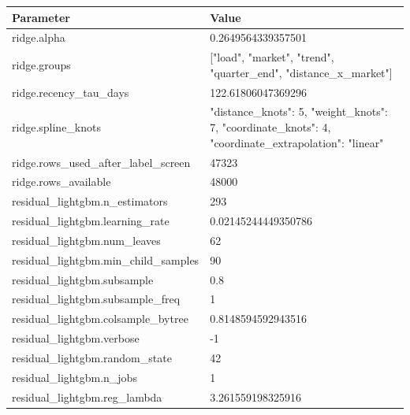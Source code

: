 \begin{tabular}{ll}
\toprule
Parameter & Value \\
\midrule
ridge.alpha & 0.2649564339357501 \\
ridge.groups & ["load", "market", "trend", "quarter\_end", "distance\_x\_market"] \\
ridge.recency\_tau\_days & 122.61806047369296 \\
ridge.spline\_knots & {"distance\_knots": 5, "weight\_knots": 7, "coordinate\_knots": 4, "coordinate\_extrapolation": "linear"} \\
ridge.rows\_used\_after\_label\_screen & 47323 \\
ridge.rows\_available & 48000 \\
residual\_lightgbm.n\_estimators & 293 \\
residual\_lightgbm.learning\_rate & 0.02145244449350786 \\
residual\_lightgbm.num\_leaves & 62 \\
residual\_lightgbm.min\_child\_samples & 90 \\
residual\_lightgbm.subsample & 0.8 \\
residual\_lightgbm.subsample\_freq & 1 \\
residual\_lightgbm.colsample\_bytree & 0.8148594592943516 \\
residual\_lightgbm.verbose & -1 \\
residual\_lightgbm.random\_state & 42 \\
residual\_lightgbm.n\_jobs & 1 \\
residual\_lightgbm.reg\_lambda & 3.261559198325916 \\
\bottomrule
\end{tabular}
